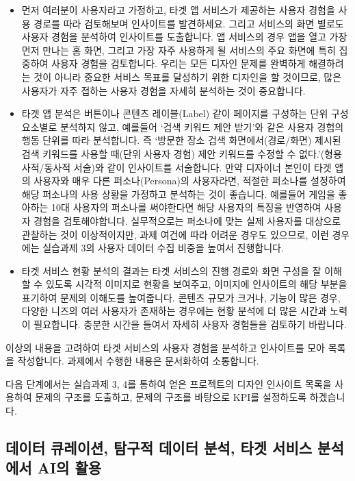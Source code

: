 \documentclass[
  letterpaper,
]{book}
\providecommand{\tightlist}{%
  \setlength{\itemsep}{0pt}\setlength{\parskip}{0pt}}\usepackage{longtable,booktabs,array}
\begin{document}
\begin{itemize}
\tightlist
\item
  먼저 여러분이 사용자라고 가정하고, 타겟 앱 서비스가 제공하는 사용자
  경험을 사용 경로를 따라 검토해보며 인사이트를 발견하세요. 그리고
  서비스의 화면 별로도 사용자 경험을 분석하여 인사이트를 도출합니다. 앱
  서비스의 경우 앱을 열고 가장 먼저 만나는 홈 화면, 그리고 가장 자주
  사용하게 될 서비스의 주요 화면에 특히 집중하여 사용자 경험을
  검토합니다. 우리는 모든 디자인 문제를 완벽하게 해결하려는 것이 아니라
  중요한 서비스 목표를 달성하기 위한 디자인을 할 것이므로, 많은 사용자가
  자주 접하는 사용자 경험을 자세히 분석하는 것이 중요합니다.
\item
  타겟 앱 분석은 버튼이나 콘텐츠 레이블(Label) 같이 페이지를 구성하는
  단위 구성요소별로 분석하지 않고, 예를들어 `검색 키워드 제안 받기'와
  같은 사용자 경험의 행동 단위를 따라 분석합니다. 즉 `방문한 장소 검색
  화면에서(경로/화면) 제시된 검색 키워드를 사용할 때(단위 사용자 경험)
  제안 키워드를 수정할 수 없다.'(형용사적/동사적 서술)와 같이 인사이트를
  서술합니다. 만약 디자이너 본인이 타겟 앱의 사용자와 매우 다른
  퍼소나(Persona)의 사용자라면, 적절한 퍼소나를 설정하여 해당 퍼소나의
  사용 상황을 가정하고 분석하는 것이 좋습니다. 예를들어 게임을 좋아하는
  10대 사용자의 퍼소나를 써야한다면 해당 사용자의 특징을 반영하여 사용자
  경험을 검토해야합니다. 실무적으로는 퍼소나에 맞는 실제 사용자를
  대상으로 관찰하는 것이 이상적이지만, 과제 여건에 따라 어려운 경우도
  있으므로, 이런 경우에는 실습과제 3의 사용자 데이터 수집 비중을 높여서
  진행합니다.
\item
  타겟 서비스 현황 분석의 결과는 타겟 서비스의 진행 경로와 화면 구성을
  잘 이해할 수 있도록 시각적 이미지로 현황을 보여주고, 이미지에
  인사이트의 해당 부분을 표기하여 문제의 이해도를 높여줍니다. 콘텐츠
  규모가 크거나, 기능이 많은 경우, 다양한 니즈의 여러 사용자가 존재하는
  경우에는 현황 분석에 더 많은 시간과 노력이 필요합니다. 충분한 시간을
  들여서 자세히 사용자 경험들을 검토하기 바랍니다.
\end{itemize}

이상의 내용을 고려하여 타겟 서비스의 사용자 경험을 분석하고 인사이트를
모아 목록을 작성합니다. 과제에서 수행한 내용은 문서화하여 소통합니다.

다음 단계에서는 실습과제 3, 4를 통하여 얻은 프로젝트의 디자인 인사이트
목록을 사용하여 문제의 구조를 도출하고, 문제의 구조를 바탕으로 KPI를
설정하도록 하겠습니다.

\subsection{데이터 큐레이션, 탐구적 데이터 분석, 타겟 서비스 분석에서
AI의
활용}\label{uxb370uxc774uxd130-uxd050uxb808uxc774uxc158-uxd0d0uxad6cuxc801-uxb370uxc774uxd130-uxbd84uxc11d-uxd0c0uxac9f-uxc11cuxbe44uxc2a4-uxbd84uxc11duxc5d0uxc11c-aiuxc758-uxd65cuxc6a9}
\end{document}

